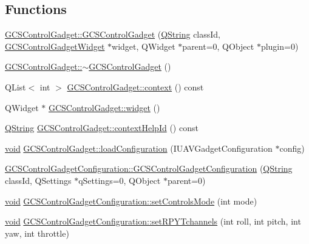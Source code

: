 \subsection*{\-Functions}
\begin{DoxyCompactItemize}
\item 
\hyperlink{group___g_c_s_control_gadget_plugin_gaa2bb4808899771140d27bd47b54ccb8c}{\-G\-C\-S\-Control\-Gadget\-::\-G\-C\-S\-Control\-Gadget} (\hyperlink{group___u_a_v_objects_plugin_gab9d252f49c333c94a72f97ce3105a32d}{\-Q\-String} class\-Id, \hyperlink{class_g_c_s_control_gadget_widget}{\-G\-C\-S\-Control\-Gadget\-Widget} $\ast$widget, \-Q\-Widget $\ast$parent=0, \-Q\-Object $\ast$plugin=0)
\item 
\hyperlink{group___g_c_s_control_gadget_plugin_ga109d324fea74699d89e95ea779cd7c18}{\-G\-C\-S\-Control\-Gadget\-::$\sim$\-G\-C\-S\-Control\-Gadget} ()
\item 
\-Q\-List$<$ int $>$ \hyperlink{group___g_c_s_control_gadget_plugin_gaebdfdbcaa43f61addf35752163d359d7}{\-G\-C\-S\-Control\-Gadget\-::context} () const 
\item 
\-Q\-Widget $\ast$ \hyperlink{group___g_c_s_control_gadget_plugin_ga36c99e15ded265f21ddeb3b0ef9a344f}{\-G\-C\-S\-Control\-Gadget\-::widget} ()
\item 
\hyperlink{group___u_a_v_objects_plugin_gab9d252f49c333c94a72f97ce3105a32d}{\-Q\-String} \hyperlink{group___g_c_s_control_gadget_plugin_ga5be6c84c2994367f7f86e3553cf68b19}{\-G\-C\-S\-Control\-Gadget\-::context\-Help\-Id} () const 
\item 
\hyperlink{group___u_a_v_objects_plugin_ga444cf2ff3f0ecbe028adce838d373f5c}{void} \hyperlink{group___g_c_s_control_gadget_plugin_ga439722d2b4016bbfaad9486b20c35a1a}{\-G\-C\-S\-Control\-Gadget\-::load\-Configuration} (\-I\-U\-A\-V\-Gadget\-Configuration $\ast$config)
\item 
\hyperlink{group___g_c_s_control_gadget_plugin_ga564a596fece84d06f7a2ff0f9151d140}{\-G\-C\-S\-Control\-Gadget\-Configuration\-::\-G\-C\-S\-Control\-Gadget\-Configuration} (\hyperlink{group___u_a_v_objects_plugin_gab9d252f49c333c94a72f97ce3105a32d}{\-Q\-String} class\-Id, \-Q\-Settings $\ast$q\-Settings=0, \-Q\-Object $\ast$parent=0)
\item 
\hyperlink{group___u_a_v_objects_plugin_ga444cf2ff3f0ecbe028adce838d373f5c}{void} \hyperlink{group___g_c_s_control_gadget_plugin_gaa1642ff7af92b8b9805e2f4ec1e55e05}{\-G\-C\-S\-Control\-Gadget\-Configuration\-::set\-Controls\-Mode} (int mode)
\item 
\hyperlink{group___u_a_v_objects_plugin_ga444cf2ff3f0ecbe028adce838d373f5c}{void} \hyperlink{group___g_c_s_control_gadget_plugin_ga60a55663d33c0fa8ede8a318f08fc639}{\-G\-C\-S\-Control\-Gadget\-Configuration\-::set\-R\-P\-Y\-Tchannels} (int roll, int pitch, int yaw, int throttle)

\end{DoxyCompactItemize}
